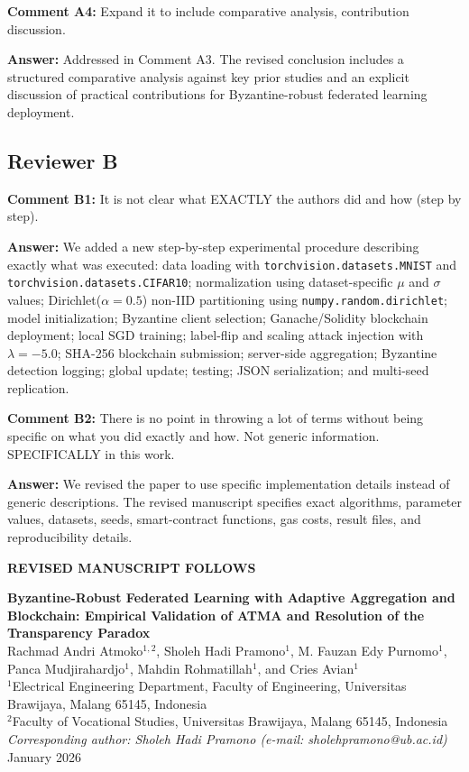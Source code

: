 \documentclass[12pt,a4paper,onecolumn]{article}
\begin{document}
\textbf{Comment A4:} Expand it to include comparative analysis, contribution discussion.

\textbf{Answer:} Addressed in Comment A3. The revised conclusion includes a structured comparative analysis against key prior studies and an explicit discussion of practical contributions for Byzantine-robust federated learning deployment.

\subsection*{Reviewer B}
\textbf{Comment B1:} It is not clear what EXACTLY the authors did and how (step by step).

\textbf{Answer:} We added a new step-by-step experimental procedure describing exactly what was executed: data loading with \texttt{torchvision.datasets.MNIST} and \texttt{torchvision.datasets.CIFAR10}; normalization using dataset-specific $\mu$ and $\sigma$ values; Dirichlet($\alpha=0.5$) non-IID partitioning using \texttt{numpy.random.dirichlet}; model initialization; Byzantine client selection; Ganache/Solidity blockchain deployment; local SGD training; label-flip and scaling attack injection with $\lambda=-5.0$; SHA-256 blockchain submission; server-side aggregation; Byzantine detection logging; global update; testing; JSON serialization; and multi-seed replication.

\textbf{Comment B2:} There is no point in throwing a lot of terms without being specific on what you did exactly and how. Not generic information. SPECIFICALLY in this work.

\textbf{Answer:} We revised the paper to use specific implementation details instead of generic descriptions. The revised manuscript specifies exact algorithms, parameter values, datasets, seeds, smart-contract functions, gas costs, result files, and reproducibility details.

\begin{center}\textbf{REVISED MANUSCRIPT FOLLOWS}\end{center}
\newpage

\begin{center}
{\LARGE\textbf{Byzantine-Robust Federated Learning with Adaptive Aggregation and Blockchain: Empirical Validation of ATMA and Resolution of the Transparency Paradox}}\\[12pt]
Rachmad Andri Atmoko$^{1,2}$, Sholeh Hadi Pramono$^{1}$, M. Fauzan Edy Purnomo$^{1}$, Panca Mudjirahardjo$^{1}$, Mahdin Rohmatillah$^{1}$, and Cries Avian$^{1}$\\[10pt]
$^{1}$Electrical Engineering Department, Faculty of Engineering, Universitas Brawijaya, Malang 65145, Indonesia\\
$^{2}$Faculty of Vocational Studies, Universitas Brawijaya, Malang 65145, Indonesia\\[5pt]
\textit{Corresponding author: Sholeh Hadi Pramono (e-mail: sholehpramono@ub.ac.id)}\\[8pt]
January 2026
\end{center}
\end{document}
